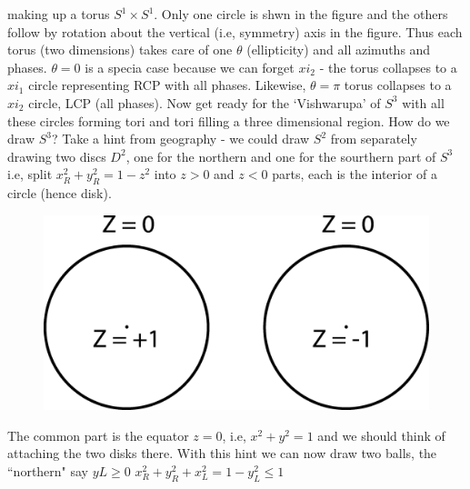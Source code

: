 making up a torus $S^1 \times S^1$. Only one circle is shwn in the figure and the others
follow by rotation about the vertical (i.e, symmetry) axis in the figure. Thus
each torus (two dimensions) takes care of one $\theta$ (ellipticity) and all azimuths
and phases. $\theta = 0$ is a specia case because we can forget $xi_2$ - the torus collapses
to a $xi_1$ circle representing RCP with all phases. Likewise, $\theta = \pi$ torus collapses
to a $xi_2$ circle, LCP (all phases). Now get ready for the `Vishwarupa' of $S^3$ with
all these circles forming tori and tori filling a three dimensional region. How do
we draw $S^3$? Take a hint from geography - we could draw $S^2$ from separately
drawing two discs $D^2$, one for the northern and one for the sourthern part of
$S^3$ i.e, split $x^2_R + y^2_R = 1 - z^2$ into $z > 0$ and $z < 0$ parts, each is the interior of
a circle (hence disk).
\begin{figure}[H]
\centering
\includegraphics[scale=0.1]{src/images/chap26/14.eps}
\end{figure}

The common part is the equator $z = 0$, i.e, $x^2 + y^2 = 1$ and we should think
of attaching the two disks there. With this hint we can now draw two balls,
the ~ ``northern" say $y L  \geq 0$  \quad $x^2_R + y^2_R + x^2_L = 1 - y^2_L \leq 1$

\smallskip

